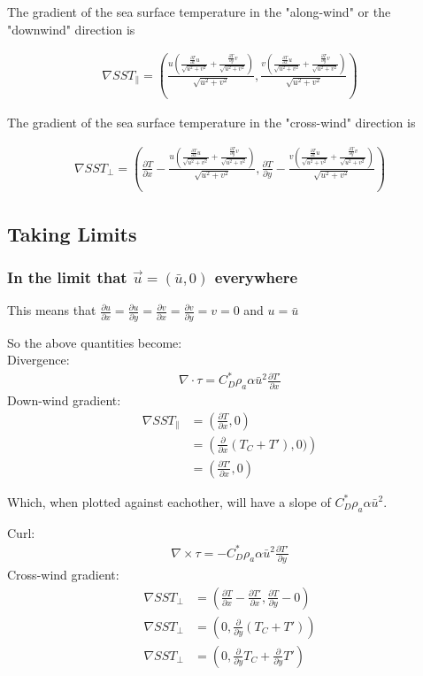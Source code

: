 \documentclass[12pt,a4paper]{article}
\newcommand{\dudx}{\frac{\partial u}{\partial x}}
\newcommand{\dudy}{\frac{\partial u}{\partial y}}
\newcommand{\dvdx}{\frac{\partial v}{\partial x}}
\newcommand{\dvdy}{\frac{\partial v}{\partial y}}
\newcommand{\dTdx}{\frac{\partial T}{\partial x}}
\newcommand{\dTdy}{\frac{\partial T}{\partial y}}
\newcommand{\dTpdx}{\frac{\partial T'}{\partial x}}
\newcommand{\dTpdy}{\frac{\partial T'}{\partial y}}
\begin{document}
The gradient of the sea surface temperature in the "along-wind" or the "downwind" direction is

\begin{align*}
\nabla SST_{\parallel} = \left( \frac{u\left( \frac{\dTdx u}{\sqrt{u^2+v^2}} + \frac{\dTdy v}{\sqrt{u^2+v^2}}\right)}{\sqrt{u^2+v^2}} ,  \frac{v\left( \frac{\dTdx u}{\sqrt{u^2+v^2}} + \frac{\dTdy v}{\sqrt{u^2+v^2}}\right)}{\sqrt{u^2+v^2}} \right)
\end{align*}

The gradient of the sea surface temperature in the "cross-wind" direction is

\begin{align*}
\nabla SST_{\bot} = \left(\dTdx- \frac{u\left( \frac{\dTdx u}{\sqrt{u^2+v^2}} + \frac{\dTdy v}{\sqrt{u^2+v^2}}\right)}{\sqrt{u^2+v^2}} , \dTdy- \frac{v\left( \frac{\dTdx u}{\sqrt{u^2+v^2}} + \frac{\dTdy v}{\sqrt{u^2+v^2}}\right)}{\sqrt{u^2+v^2}} \right)
\end{align*}

\newpage

\subsection*{Taking Limits}

\subsubsection*{In the limit that $\vec{u} = (\bar{u},0)$ everywhere}

This means that $\dudx = \dudy = \dvdx = \dvdy = v = 0$ and $u=\bar{u}$

So the above quantities become:\\
Divergence:
\begin{align*}
\nabla \cdot \tau = C_D^* \rho_a \alpha\bar{u}^2\dTpdx
\end{align*}
Down-wind gradient:
\begin{align*}
\nabla SST_{\parallel} &= \left( \dTdx , 0 \right) \\
&= \left( \frac{\partial}{\partial x}(T_C + T') , 0) \right)\\
&= \left( \dTpdx, 0 \right)
\end{align*}

Which, when plotted against eachother, will have a slope of $ C_D^* \rho_a \alpha\bar{u}^2$.\\
\vspace*{0.5in}

Curl:
\begin{align*}
\nabla \times \tau = -C_D^* \rho_a \alpha\bar{u}^2\dTpdy
\end{align*}
Cross-wind gradient:
\begin{align*}
\nabla SST_{\bot} &= \left(\dTdx- \dTpdx , \dTdy- 0 \right)\\
\nabla SST_{\bot} &= \left(0 , \frac{\partial}{\partial y}(T_C + T') \right)\\
\nabla SST_{\bot} &= \left(0 , \frac{\partial}{\partial y}T_C+ \frac{\partial}{\partial y}T' \right)
\end{align*}
\end{document}
